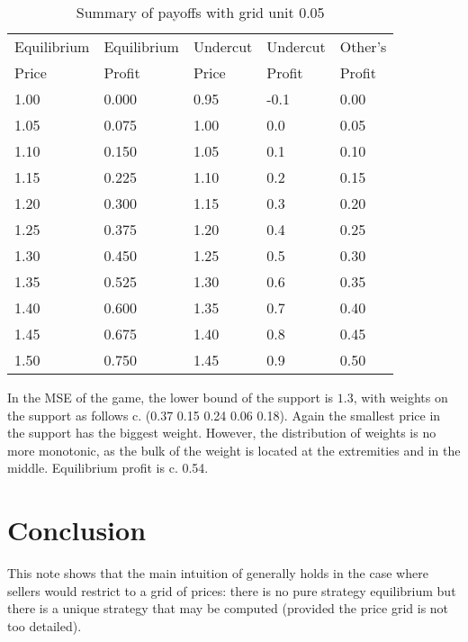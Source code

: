 \documentclass[11pt]{article}
\begin{document}
\begin{table}[h]
\caption{Summary of payoffs with grid unit 0.05}
\begin{singlespace}
\begin{tabular}{lllll}
   Equilibrium & Equilibrium & Undercut & Undercut & Other's  \\
   Price       & Profit      & Price    & Profit   & Profit   \\
   1.00        & 0.000       & 0.95     & -0.1     & 0.00     \\
   1.05        & 0.075       & 1.00     &  0.0     & 0.05     \\
   1.10        & 0.150       & 1.05     &  0.1     & 0.10     \\
   1.15        & 0.225       & 1.10     &  0.2     & 0.15     \\
   1.20        & 0.300       & 1.15     &  0.3     & 0.20     \\
   1.25        & 0.375       & 1.20     &  0.4     & 0.25     \\
   1.30        & 0.450       & 1.25     &  0.5     & 0.30     \\
   1.35        & 0.525       & 1.30     &  0.6     & 0.35     \\
   1.40        & 0.600       & 1.35     &  0.7     & 0.40     \\
   1.45        & 0.675       & 1.40     &  0.8     & 0.45     \\
   1.50        & 0.750       & 1.45     &  0.9     & 0.50     \\
\end{tabular}
\end{singlespace}
\end{table}

In the MSE of the game, the lower bound of the support is $1.3$, with weights on the support as follows c. (0.37 0.15 0.24 0.06 0.18). Again the smallest price in the support has the biggest weight. However, the distribution of weights is no more monotonic, as the bulk of the weight is located at the extremities and in the middle. Equilibrium profit is c. 0.54.

\section{Conclusion}

This note shows that the main intuition of \cite{VAR80} generally holds in the case where sellers would restrict to a grid of prices: there is no pure strategy equilibrium but there is a unique strategy that may be computed (provided the price grid is not too detailed).
\end{document}
